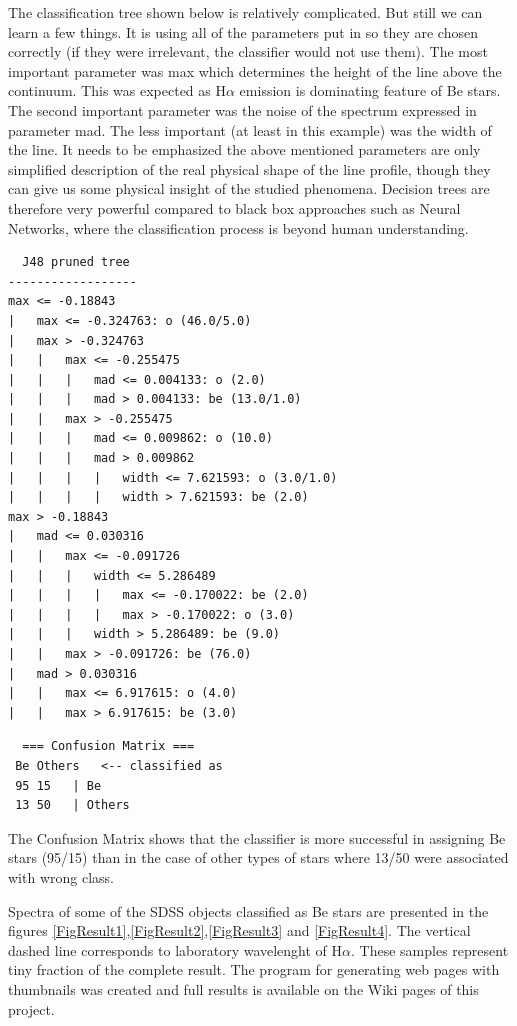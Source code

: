 The classification tree shown below is relatively complicated. But
still we can learn a few things. It is using all of the parameters put
in so they are chosen correctly (if they were irrelevant, the
classifier would not use them). The most important parameter was
\textrm{max} which determines the height of the line above the
continuum. This was expected as H$\alpha$ emission is dominating
feature of Be stars. The second important parameter was the noise of
the spectrum expressed in parameter \textrm{mad}. The less important
(at least in this example) was the width of the line. It needs to be
emphasized the above mentioned parameters are only simplified
description of the real physical shape of the line profile, though
they can give us some physical insight of the studied
phenomena. Decision trees are therefore very powerful compared to
black box approaches such as Neural Networks, where the classification
process is beyond human understanding.

\begin{lstlisting}
  J48 pruned tree
------------------
max <= -0.18843
|   max <= -0.324763: o (46.0/5.0)
|   max > -0.324763
|   |   max <= -0.255475
|   |   |   mad <= 0.004133: o (2.0)
|   |   |   mad > 0.004133: be (13.0/1.0)
|   |   max > -0.255475
|   |   |   mad <= 0.009862: o (10.0)
|   |   |   mad > 0.009862
|   |   |   |   width <= 7.621593: o (3.0/1.0)
|   |   |   |   width > 7.621593: be (2.0)
max > -0.18843
|   mad <= 0.030316
|   |   max <= -0.091726
|   |   |   width <= 5.286489
|   |   |   |   max <= -0.170022: be (2.0)
|   |   |   |   max > -0.170022: o (3.0)
|   |   |   width > 5.286489: be (9.0)
|   |   max > -0.091726: be (76.0)
|   mad > 0.030316
|   |   max <= 6.917615: o (4.0)
|   |   max > 6.917615: be (3.0)
\end{lstlisting}


\begin{lstlisting}
  === Confusion Matrix ===
 Be Others   <-- classified as
 95 15   | Be
 13 50   | Others
\end{lstlisting}

The Confusion Matrix shows that the classifier is more successful in
assigning Be stars (95/15) than in the case of other types of stars
where 13/50 were associated with wrong class.


Spectra of some of the SDSS objects classified as Be stars are
presented in the figures
\ref{FigResult1},\ref{FigResult2},\ref{FigResult3} and
\ref{FigResult4}. The vertical dashed line corresponds to laboratory
wavelenght of H$\alpha$. These samples represent tiny fraction of the
complete result. The program for generating web pages with thumbnails
was created and full results is available on the Wiki pages of this
project.

